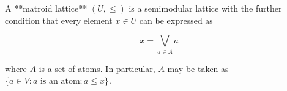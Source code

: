 A **matroid lattice** $(U, \leq)$ is a semimodular lattice with the further condition that every element $x \in U$ can be expressed as

$$x = \bigvee_{a \in A} a$$

where $A$ is a set of atoms. In particular, $A$ may be taken as $\{a \in V : a \text{ is an atom}; a \leq x\}$.
